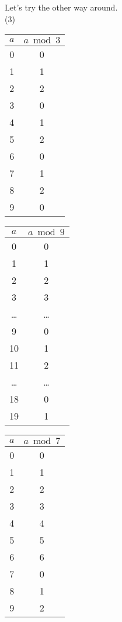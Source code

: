 \noindent
Let's try the other way around.\\
(3)
\noindent
\begin{minipage}{0.32\textwidth}
    \centering
    \begin{tabular}{c|c}
        $a$ & $a \bmod 3$ \\
        \hline
        0   & 0           \\
        1   & 1           \\
        2   & 2           \\
        3   & 0           \\
        4   & 1           \\
        5   & 2           \\
        6   & 0           \\
        7   & 1           \\
        8   & 2           \\
        9   & 0           \\
    \end{tabular}
\end{minipage}%
\begin{minipage}{0.32\textwidth}
    \centering
    \begin{tabular}{c|c}
        $a$   & $a \bmod 9$ \\
        \hline
        0     & 0           \\
        1     & 1           \\
        2     & 2           \\
        3     & 3           \\
        \dots & \dots       \\
        9     & 0           \\
        10    & 1           \\
        11    & 2           \\
        \dots & \dots       \\
        18    & 0           \\
        19    & 1           \\
    \end{tabular}
\end{minipage}%
\begin{minipage}{0.32\textwidth}
    \centering
    \begin{tabular}{c|c}
        $a$ & $a \bmod 7$ \\
        \hline
        0   & 0           \\
        1   & 1           \\
        2   & 2           \\
        3   & 3           \\
        4   & 4           \\
        5   & 5           \\
        6   & 6           \\
        7   & 0           \\
        8   & 1           \\
        9   & 2           \\
    \end{tabular}
\end{minipage}

